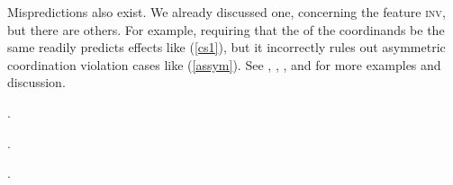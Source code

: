 {%


Mispredictions also exist. We already discussed one, concerning the feature \textsc{inv}, but there are others. For example, requiring that the \slashv of the coordinands be the same readily predicts  effects like 
(\ref{cs1}), but it incorrectly rules out asymmetric coordination violation cases like (\ref{assym}). 
See \citet{goldsmith}, \citet{lakoff86}, \citet{levinprince86}, and \citet{kehler} for more examples and discussion.


\begin{exe}
\ex \begin{xlista}
.

.

.
\end{xlista}\label{cs1}
\end{exe}




}
